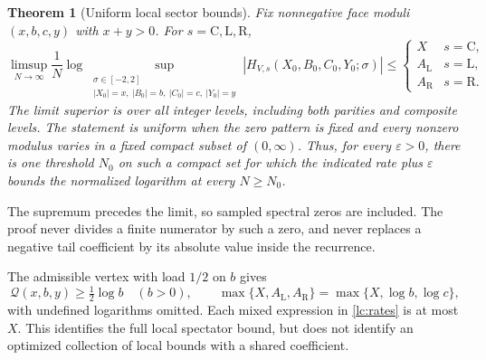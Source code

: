 \documentclass[11pt]{article}
\numberwithin{equation}{section}
\newtheorem{theorem}{Theorem}[section]
\theoremstyle{remark}\newtheorem{remark}[theorem]{Remark}
\begin{document}
\begin{theorem}[Uniform local sector bounds]\label{lc:main}
Fix nonnegative face moduli \((x,b,c,y)\) with \(x+y>0\). For
\(s=\mathrm C,\mathrm L,\mathrm R\),
\begin{equation}\label{lc:main-rate}
 \limsup_{N\to\infty}\frac1N
 \log\sup_{\substack{\sigma\in[-2,2]\\
 |X_0|=x,\ |B_0|=b,\ |C_0|=c,\ |Y_0|=y}}
 |H_{V,s}(X_0,B_0,C_0,Y_0;\sigma)|
 \le
 \begin{cases}
 X&s=\mathrm C,\\
 A_{\mathrm L}&s=\mathrm L,\\
 A_{\mathrm R}&s=\mathrm R.
 \end{cases}
\end{equation}
The limit superior is over all integer levels, including both parities
and composite levels. The statement is uniform when the zero pattern
is fixed and every nonzero modulus varies in a fixed compact subset
of \((0,\infty)\). Thus, for every \(\varepsilon>0\), there is one
threshold \(N_0\) on such a compact set for which the indicated rate
plus \(\varepsilon\) bounds the normalized logarithm at every \(N\ge N_0\).
\end{theorem}

The supremum precedes the limit, so sampled spectral zeros are included.
The proof never divides a finite numerator by such a zero, and never
replaces a negative tail coefficient by its absolute value inside the
recurrence.

The admissible vertex with load \(1/2\) on \(b\) gives
\begin{equation}\label{lc:spectator}
 \mathcal Q(x,b,y)\ge\tfrac12\log b\quad(b>0),\qquad
 \max\{X,A_{\mathrm L},A_{\mathrm R}\}=\max\{X,\log b,\log c\},
\end{equation}
with undefined logarithms omitted. Each mixed expression in
\eqref{lc:rates} is at most \(X\). This identifies the full local
spectator bound, but does not identify an optimized collection of
local bounds with a shared coefficient.
\end{document}
